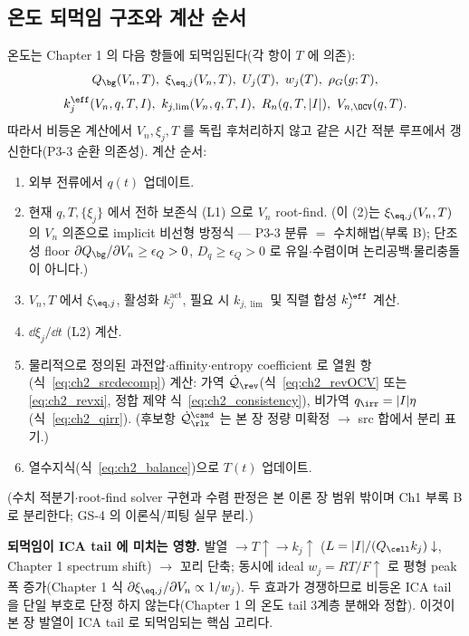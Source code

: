 \subsection{온도 되먹임 구조와 계산 순서}\label{sec:ch2_feedback}
온도는 Chapter 1 의 다음 항들에 되먹임된다(각 항이 $T$ 에 의존):
\begin{equation}
Q_\bg(V_n,T),\ \xi_{\eq,j}(V_n,T),\ U_j(T),\ w_j(T),\ \rho_G(g;T),
\label{eq:ch2_feedT1}
\end{equation}
\begin{equation}
k_j^{\eff}(V_n,q,T,I),\ k_{j,\lim}(V_n,q,T,I),\ R_n(q,T,|I|),\ V_{n,\OCV}(q,T).
\label{eq:ch2_feedT2}
\end{equation}
따라서 비등온 계산에서 $V_n,\xi_j,T$ 를 독립 후처리하지 않고 같은 시간 적분 루프에서 갱신한다(P3-3 순환
의존성). 계산 순서:
\begin{enumerate}[label=\arabic*),leftmargin=2.0em]
\item 외부 전류에서 $q(t)$ 업데이트.
\item 현재 $q,T,\{\xi_j\}$ 에서 전하 보존식 (L1) 으로 $V_n$ root-find.
  (이 (2)는 $\xi_{\eq,j}(V_n,T)$ 의 $V_n$ 의존으로 implicit 비선형 방정식 — P3-3 분류 $=$ 수치해법(부록 B);
  단조성 floor $\partial Q_\bg/\partial V_n\ge\epsilon_Q>0$, $D_q\ge\epsilon_Q>0$ 로 유일$\cdot$수렴이며 논리공백$\cdot$물리충돌이 아니다.)
\item $V_n,T$ 에서 $\xi_{\eq,j}$, 활성화 $k_j^{\mathrm{act}}$, 필요 시 $k_{j,\lim}$ 및 직렬 합성 $k_j^{\eff}$ 계산.
\item $\dd\xi_j/\dd t$ (L2) 계산.
\item 물리적으로 정의된 과전압$\cdot$affinity$\cdot$entropy coefficient 로 열원 항(식~\eqref{eq:ch2_srcdecomp}) 계산:
  가역 $\dot{\mathcal Q}_{\rev}$(식~\eqref{eq:ch2_revOCV} 또는 \eqref{eq:ch2_revxi}, 정합 제약 식~\eqref{eq:ch2_consistency}),
  비가역 $q_\irr=|I|\eta$(식~\eqref{eq:ch2_qirr}). (후보항 $\dot{\mathcal Q}_{\rlx}^{\cand}$ 는 본 장 정량 미확정 $\to$ src 합에서 분리 표기.)
\item 열수지식(식~\eqref{eq:ch2_balance})으로 $T(t)$ 업데이트.
\end{enumerate}
(수치 적분기$\cdot$root-find solver 구현과 수렴 판정은 본 이론 장 범위 밖이며 Ch1 부록 B 로 분리한다; GS-4 의
이론식/피팅 실무 분리.)
\begin{boundbox}
\textbf{되먹임이 ICA tail 에 미치는 영향.} 발열 $\to T\uparrow\to k_j\uparrow$ ($L=|I|/(Q_\cell k_j)\downarrow$,
Chapter 1 spectrum shift) $\to$ 꼬리 단축; 동시에 ideal $w_j=RT/F\uparrow$ 로 평형 peak 폭 증가(Chapter 1
식 $\partial\xi_{\eq,j}/\partial V_n\propto1/w_j$). 두 효과가 경쟁하므로 비등온 ICA tail 을 단일 부호로 단정
하지 않는다(Chapter 1 의 온도 tail 3계층 분해와 정합). 이것이 본 장 발열이 ICA tail 로 되먹임되는 핵심 고리다.
\end{boundbox}

